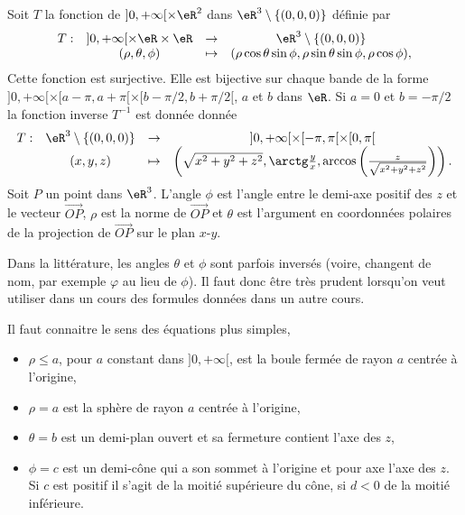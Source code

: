 Soit $T$ la fonction de $]0, +\infty[\times \eR^2$ dans $\eR^3\setminus\{(0,0,0)\}$ définie par
\begin{equation}
  \begin{array}{lccc}
    T: &]0, +\infty[\times \eR\times \eR & \to & \eR^3\setminus\{(0,0,0)\}\\
 & (\rho, \theta, \phi)&\mapsto& (\rho\cos \theta\sin \phi, \rho \sin \theta\sin \phi, \rho\cos \phi),
  \end{array}
\end{equation}
Cette fonction est surjective. Elle est bijective sur chaque bande de la forme  $]0, +\infty[\times [a-\pi,a+\pi[\times [b-\pi/2, b+\pi/2[$, $a$ et $b$ dans $\eR$.  Si $a =0$ et $b=-\pi/2$ la fonction inverse $T^{-1}$ est donnée donnée
\begin{equation}
  \begin{array}{lccc}
    T: &\eR^3\setminus\{(0,0,0)\} & \to & ]0, +\infty[\times [-\pi,\pi[\times [0, \pi[\\
 & (x,y,z)&\mapsto& \left(\sqrt{x^2+y^2+z^2}, \arctg \frac{y}{x}, \arccos \left(\frac{z}{\sqrt{x^2+y^2+z^2}}\right)\right).
  \end{array}
\end{equation}
Soit $ P$ un point dans $\eR^3$. L'angle $\phi$ est l'angle entre le demi-axe positif des $z$ et le vecteur $\overrightarrow{OP}$, $\rho$ est la norme de $\overrightarrow{OP}$ et $\theta$ est l'argument en coordonnées polaires de la projection de $\overrightarrow{OP}$ sur le plan $x$-$y$.

\begin{remark}
	Dans la littérature, les angles $\theta$ et $\phi$ sont parfois inversés (voire, changent de nom, par exemple $\varphi$ au lieu de $\phi$). Il faut donc être très prudent lorsqu'on veut utiliser dans un cours des formules données dans un autre cours.
\end{remark}

\begin{example}
Il faut connaitre le sens des équations plus simples,
\begin{itemize}
\item $\rho\leq a$, pour $a$ constant dans  $]0, +\infty[$, est la boule fermée de rayon $a$ centrée à l'origine,
\item $\rho= a$ est  la sphère de rayon $a$ centrée à l'origine,
\item $\theta = b$ est un demi-plan ouvert et sa fermeture contient l'axe des $z$,
\item $\phi= c$ est un demi-cône qui a  son sommet à l'origine et  pour axe l'axe des $z$.  Si $c$ est positif  il s'agit  de la moitié supérieure du cône, si $d<0$ de la moitié inférieure.
\end{itemize}
 \end{example}

